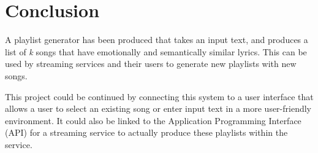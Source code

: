 \documentclass[11pt]{article}
\begin{document}
\section{Conclusion}

A playlist generator has been produced that takes an input text, and produces a list of \textit{k} songs that have emotionally and semantically similar lyrics. This can be used by streaming services and their users to generate new playlists with new songs.

This project could be continued by connecting this system to a user interface that allows a user to select an existing song or enter input text in a more user-friendly environment. It could also be linked to the Application Programming Interface (API) for a streaming service to actually produce these playlists within the service.



\end{document}
